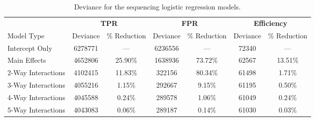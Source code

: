 \documentclass[12pt]{article}
\begin{document}
\begin{table}[ht]
\centering
\begin{tabular}{l|cc|cc|cc}
  \hline
	& \multicolumn{2}{c|}{\textbf{TPR}} & \multicolumn{2}{c|}{\textbf{FPR}} & \multicolumn{2}{c}{\textbf{Efficiency}}\\
	Model Type & Deviance & \% Reduction & Deviance & \% Reduction & Deviance & \% Reduction\\
  \hline
	Intercept Only & 6278771 & --- & 6236556 & --- & 72340 & ---\\
	Main Effects  & 4652806 & 25.90\% & 1638936 & 73.72\% & 62567 & 13.51\%\\
	2-Way Interactions  & 4102415 & 11.83\% & 322156 & 80.34\% & 61498 & 1.71\%\\
	3-Way Interactions  & 4055216 & 1.15\% & 292667 & 9.15\% & 61195 & 0.50\%\\
	4-Way Interactions  & 4045588 & 0.24\% & 289578 & 1.06\% & 61049 & 0.24\%\\
	5-Way Interactions  & 4043083 & 0.06\% & 289187 & 0.14\% & 61030 & 0.03\%\\
   \hline
\end{tabular}
\caption{Deviance for the sequencing logistic regression models.}
\label{tab:devSeq}
\end{table}
\end{document}
